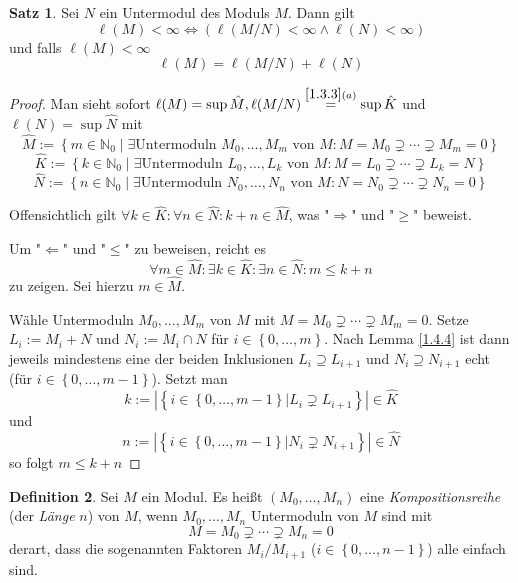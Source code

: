 \documentclass[
twoside=semi,
fontsize=12,
DIV=12, 
cleardoublepage=current,
leqno,
headings=optiontoheadandtoc, 
toc=idx
]{scrbook}
\newcommand{\N}{\mathbb{N}}
\newcommand{\brac}[1]{\left( #1 \right)}
\newcommand{\set}[1]{\left\{ #1 \right\}}
\theoremstyle{definition}
\newtheorem{definition}{Definition}[section]
\newtheorem{satz}[definition]{Satz}
\begin{document}
	\begin{satz}\label{1.4.10}\hfill\newline
		Sei $N$ ein Untermodul des Moduls $M$. Dann gilt
			\[\ell(M) < \infty \Leftrightarrow \brac{\ell(M/N) < \infty \land \ell(N)< \infty}\]
		und falls $\ell(M) < \infty$
			\[\ell(M) = \ell(M/N) + \ell(N)\]
		
		\begin{proof}
			Man sieht sofort $\ell(M) = \sup \hat M, \ell(M/N) \overset{\ref{1.3.3}(a)}{=} \sup \hat{K}$ und $\ell(N) = \sup \hat N$ mit 
				\[\hat M := \set{m \in \N_0 \mid \exists \textrm{Untermoduln } M_0, \dots, M_m \textrm{ von } M: M = M_0 \supsetneq \cdots \supsetneq M_m = 0}\]
				\[\hat K := \set{k \in \N_0 \mid \exists \textrm{Untermoduln } L_0, \dots, L_k \textrm{ von } M: M = L_0 \supsetneq \cdots \supsetneq L_k = N}\]
				\[\hat N := \set{n \in \N_0 \mid \exists \textrm{Untermoduln } N_0, \dots, N_n \textrm{ von } M: N = N_0 \supsetneq \cdots \supsetneq N_n = 0}\]
			
			Offensichtlich gilt $\forall k \in \hat K: \forall n \in \hat N: k + n \in \hat M$, was "$\Longrightarrow$" und "$\geq$" beweist.
			
			\noindent Um "$\Longleftarrow$" und "$\leq$" zu beweisen, reicht es 
				\[\forall m \in \hat M: \exists k \in \hat K: \exists n \in \hat N: m \leq k + n\]
			zu zeigen. Sei hierzu $m \in \hat M$. 
			
			W\"ahle Untermoduln $M_0, \dots, M_m$ von $M$ mit $M = M_0 \supsetneq \cdots \supsetneq M_m = 0$.
			Setze $L_i := M_i + N$ und $N_i := M_i \cap N$ f\"ur $i \in \set{0, \dots, m}$. Nach Lemma \ref{1.4.4} ist dann jeweils mindestens eine der beiden Inklusionen $L_i \supseteq L_{i+1}$ und $N_i \supseteq N_{i+1}$ echt (f\"ur $i \in \set{0, \dots, m-1}$). Setzt man
				\[k := |\set{i \in \set{0, \dots, m - 1}| L_i \supsetneq L_{i+1}}| \in \hat K\] und
				\[n := |\set{i \in \set{0, \dots, m - 1}| N_i \supsetneq N_{i+1}}| \in \hat N\]
			so folgt $m \leq k + n$ 
		\end{proof}
	\end{satz}

	\begin{definition}\label{1.4.11}\hfill\newline
		Sei $M$ ein Modul. Es heißt $(M_0, \dots, M_n)$ eine \emph{Kompositionsreihe} (der \emph{L\"ange} $n$) von $M$, wenn $M_0, \dots, M_n$ Untermoduln von $M$ sind mit 
			\[M=M_0 \supsetneq \cdots \supsetneq M_n = 0\]
		derart, dass die sogenannten Faktoren $M_i/M_{i+1}$ ($i \in \set{0, \dots, n-1}$) alle einfach sind.
	\end{definition}
\end{document}
